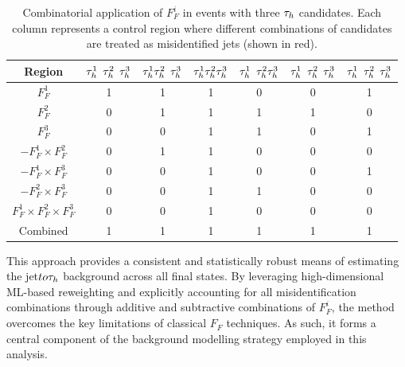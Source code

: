 \begin{table}[!htbp]
\centering
\renewcommand{\arraystretch}{1.5} %
\setlength{\tabcolsep}{10pt} %
\begin{tabular}{ccccccc}
\hline
Region & \textcolor{red}{$\tau_h^1$} $\tau_h^2$ $\tau_h^3$ & \textcolor{red}{$\tau_h^1 \tau_h^2$} $\tau_h^3$ & \textcolor{red}{$\tau_h^1 \tau_h^2 \tau_h^3$} & $\tau_h^1$ \textcolor{red}{$\tau_h^2 \tau_h^3$} & $\tau_h^1$ \textcolor{red}{$\tau_h^2$} $\tau_h^3$ & \textcolor{red}{$\tau_h^1$} $\tau_h^2$ \textcolor{red}{$\tau_h^3$} \\ \hline

$F_F^1$ & 1 & 1 & 1 & 0 & 0 & 1 \\
\arrayrulecolor{lightgray} \hline

$F_F^2$ & 0 & 1 & 1 & 1 & 1 & 0 \\
\arrayrulecolor{lightgray} \hline

$F_F^3$ & 0 & 0 & 1 & 1 & 0 & 1 \\
\arrayrulecolor{lightgray} \hline

$-F_F^1 \times F_F^2$ & 0 & 1 & 1 & 0 & 0 & 0 \\
\arrayrulecolor{lightgray} \hline

$-F_F^1 \times F_F^3$ & 0 & 0 & 1 & 0 & 0 & 1 \\
\arrayrulecolor{lightgray} \hline

$-F_F^2 \times F_F^3$ & 0 & 0 & 1 & 1 & 0 & 0 \\
\arrayrulecolor{lightgray} \hline

$F_F^1 \times F_F^2 \times F_F^3$ & 0 & 0 & 1 & 0 & 0 & 0 \\
\arrayrulecolor{black} \hline

Combined & 1 & 1 & 1 & 1 & 1 & 1 \\
\end{tabular}
\caption[Combinatorial application of Fake Factors for three $\PGt_h$ candidates.]{
Combinatorial application of $F_F^i$ in events with three $\PGt_h$ candidates. Each column represents a control region where different combinations of candidates are treated as misidentified jets (shown in red).}
\label{Table:Chapter_6_FFApplication_3Taus}
\end{table}

This approach provides a consistent and statistically robust means of estimating the jet$to\tau_h$ background across all final states. By leveraging high-dimensional ML-based reweighting and explicitly accounting for all misidentification combinations through additive and subtractive combinations of $F_F^i$, the method overcomes the key limitations of classical $F_F$ techniques. As such, it forms a central component of the background modelling strategy employed in this analysis.

